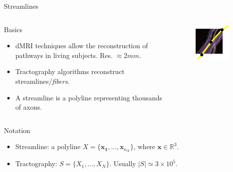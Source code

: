 \documentclass{beamer}
\begin{document}
\begin{frame}{Streamlines}
  \begin{columns}
    \begin{column}{0.55\linewidth}
      \begin{block}{Basics}
        \begin{itemize}
        \item dMRI techniques allow the reconstruction of pathways in
          living subjects. Res. $\approx 2mm$.
        \item Tractography algorithms reconstruct
          \alert{streamlines}/\emph{fibers}.
        \item A streamline is a polyline representing thousands of
          axons.
        \end{itemize}
      \end{block}
    \end{column}
    \begin{column}{0.45\linewidth}
      \begin{figure}
        \centering
        \includegraphics[width=4.5cm]{streamline_axons}
      \end{figure}
    \end{column}
  \end{columns}
  \begin{block}{Notation}
    \begin{itemize}
    \item Streamline: a polyline $X
      =\{\mathbf{x_1},\ldots,\mathbf{x}_{n_X}\}$, where $\mathbf{x}
      \in \mathbb{R}^3$.
    \item Tractography: $S = \{X_1,\ldots,X_N\}$. Usually $|S| \simeq
      3 \times 10^5$.
    \end{itemize}
  \end{block}
\end{frame}
\end{document}
